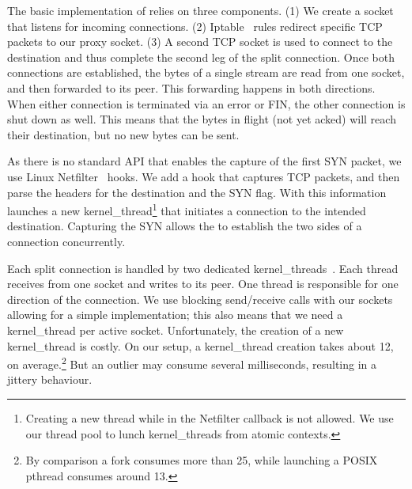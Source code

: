  The basic implementation of \ksplit relies on three components. (1) We create a socket that listens for incoming connections. (2) Iptable~\cite{iptables} rules redirect specific TCP packets to our proxy socket. (3) A second TCP socket is used to connect to the destination and thus complete the second leg of the split connection. Once both connections are established, the bytes of a single stream are read from one socket, and then forwarded to its peer. This forwarding happens in both directions. When either connection is terminated via an error or FIN, the other connection is shut down as well. This means that the bytes in flight (\ie not yet acked) will reach their destination, but no new bytes can be sent.


As there is no standard API that enables the capture of the first SYN packet, we use Linux Netfilter~\cite{netfilter} hooks. We add a hook that captures TCP packets, and then parse the headers for the destination and the SYN flag. With this information \ksplit launches a new kernel\_thread\footnote{Creating a new thread while in the Netfilter callback is not allowed. We use our thread pool to lunch kernel\_threads from atomic contexts.} that initiates a connection to the intended destination. Capturing the SYN allows the \proxies to establish the two sides of a connection concurrently.

Each split connection is handled by two dedicated kernel\_threads~\cite{kthread}. Each thread receives from one socket and writes to its peer. One thread is responsible for one direction of the connection. We use blocking send/receive calls with our sockets allowing for a simple implementation; this also means that we need a kernel\_thread per active socket. Unfortunately, the creation of a new kernel\_thread is costly. On our setup, a kernel\_thread creation takes about 12\usec, on average.\footnote{By comparison a fork consumes more than 25\usec , while launching a POSIX pthread consumes around 13\usec.} But an outlier may consume several milliseconds, resulting in a jittery behaviour.

